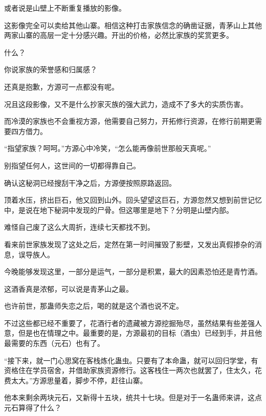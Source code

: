 \begin{this_body}
或者说是山壁上不断重复播放的影像。

这影像完全可以卖给其他山寨。相信这种打击家族信念的确凿证据，青茅山上其他两家山寨的高层一定十分感兴趣。开出的价格，必然比家族的奖赏更多。

什么？

你说家族的荣誉感和归属感？

还真是抱歉，方源可一点都没有呢。

况且这段影像，又不是什么抄家灭族的强大武力，造成不了多大的实质伤害。

而冷漠的家族也不会重视方源，他需要自己努力，开拓修行资源，在修行前期更需要四方借力。

“指望家族？呵呵。”方源心中冷笑，“怎么能再像前世那般天真呢。”

别指望任何人，这世间的一切都得靠自己。

确认这秘洞已经搜刮干净之后，方源便按照原路返回。

顶着水压，挤出巨石，他又回到山外。回头望望这巨石，方源忽然又想到前世记忆中，是说在地下秘洞中发现的尸骨。但这哪里是地下？分明是山壁内部。

难怪自己废了这么大周折，连续七天都找不到。

看来前世家族发现了这处之后，定然在第一时间摧毁了影壁，又发出真假掺杂的消息，误导族人。

今晚能够发现这里，一部分是运气，一部分是积累，最大的因素恐怕还是青竹酒。

这酒香真是浓郁，可以说是青茅山之最。

也许前世，那蛊师失恋之后，喝的就是这个酒也说不定。

不过这些都已经不重要了，花酒行者的遗藏被方源挖掘殆尽，虽然结果有些差强人意，但是也在情理之中。最重要的是，方源最初的目标（酒虫）已经到手，并且他最需要的东西（元石）也有了。

“接下来，就一门心思窝在客栈炼化蛊虫。只要有了本命蛊，就可以回归学堂，有资格住在学员宿舍，并借助家族资源修行。这客栈住一两次也就罢了，住太久，花费太大。”方源思量着，脚步不停，赶往山寨。

他本来剩余两块元石，又新得十五块，统共十七块。但是对于一名蛊师来讲，这点元石算得了什么？

\end{this_body}

